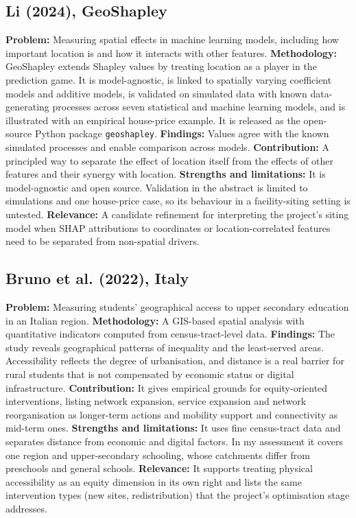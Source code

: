 \documentclass[journal]{IEEEtran}
\begin{document}
\subsection{Li (2024), GeoShapley \cite{li2024}}
\textbf{Problem:} Measuring spatial effects in machine learning models, including how important location is and how it interacts with other features.
\textbf{Methodology:} GeoShapley extends Shapley values by treating location as a player in the prediction game. It is model-agnostic, is linked to spatially varying coefficient models and additive models, is validated on simulated data with known data-generating processes across seven statistical and machine learning models, and is illustrated with an empirical house-price example. It is released as the open-source Python package \texttt{geoshapley}.
\textbf{Findings:} Values agree with the known simulated processes and enable comparison across models.
\textbf{Contribution:} A principled way to separate the effect of location itself from the effects of other features and their synergy with location.
\textbf{Strengths and limitations:} It is model-agnostic and open source. Validation in the abstract is limited to simulations and one house-price case, so its behaviour in a facility-siting setting is untested.
\textbf{Relevance:} A candidate refinement for interpreting the project's siting model when SHAP attributions to coordinates or location-correlated features need to be separated from non-spatial drivers.

\subsection{Bruno et al. (2022), Italy \cite{italy2022}}
\textbf{Problem:} Measuring students' geographical access to upper secondary education in an Italian region.
\textbf{Methodology:} A GIS-based spatial analysis with quantitative indicators computed from census-tract-level data.
\textbf{Findings:} The study reveals geographical patterns of inequality and the least-served areas. Accessibility reflects the degree of urbanisation, and distance is a real barrier for rural students that is not compensated by economic status or digital infrastructure.
\textbf{Contribution:} It gives empirical grounds for equity-oriented interventions, listing network expansion, service expansion and network reorganisation as longer-term actions and mobility support and connectivity as mid-term ones.
\textbf{Strengths and limitations:} It uses fine census-tract data and separates distance from economic and digital factors. In my assessment it covers one region and upper-secondary schooling, whose catchments differ from preschools and general schools.
\textbf{Relevance:} It supports treating physical accessibility as an equity dimension in its own right and lists the same intervention types (new sites, redistribution) that the project's optimisation stage addresses.
\end{document}
